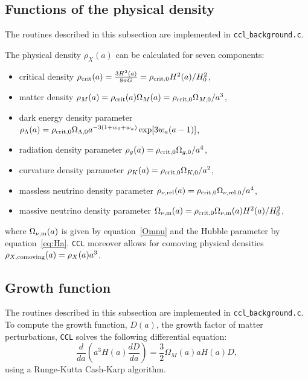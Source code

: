 \documentclass[\docopts]{\docclass}
\newcommand{\ccl}{{\tt CCL}\xspace}
\begin{document}
\subsection{Functions of the physical density}
\label{subsec:physicaldensity}

The routines described in this subsection are implemented in {\tt ccl$\_$background.c}.

The physical density $\rho_X(a)$ can be calculated for seven components:
\begin{itemize}
\item critical density $\rho_{\rm crit}(a) = {{3 H^2(a)} \over { 8 \pi G}} = \rho_{\rm crit,0} H^2(a) / H_0^2$,
\item matter density $\rho_M(a) = \rho_{\rm crit}(a) \Omega_M(a) = \rho_{\rm crit,0} \Omega_{M,0} / a^{3}$,
\item dark energy density parameter $\rho_\Lambda(a) = \rho_{\rm crit,0} \Omega_{\Lambda,0} a^{-3(1+w_0+w_a)} \exp[3 w_a (a-1)]$,
\item radiation density parameter $\rho_g(a) = \rho_{\rm crit,0} \Omega_{g,0} / a^{4}$,
\item curvature density parameter $\rho_K(a) = \rho_{\rm crit,0} \Omega_{K,0} / a^{2}$,
\item massless neutrino density parameter $\rho_{\nu, {\rm rel}}(a) = \rho_{\rm crit,0} \Omega_{\nu, {\rm rel},0} / a^{4}$,
\item massive neutrino density parameter $\Omega_{\nu, {\rm m}}(a) = \rho_{\rm crit,0} \Omega_{\nu, {\rm m}}(a) H^2(a) / H_0^2$,
\end{itemize}
where $\Omega_{\nu, {\rm m}}(a)$ is given by equation~\ref{Omnu} and the Hubble parameter by equation~\ref{eq:Ha}. \ccl moreover allows for comoving physical densities $\rho_{X, {\rm comoving}}(a) = \rho_X(a) a^3$.


\subsection{Growth function}
\label{sec:growth}

The routines described in this subsection are implemented in {\tt ccl$\_$background.c}.
To compute the growth function, $D(a)$, the growth factor of matter perturbations, \ccl solves the following differential equation:
\begin{equation}
  \frac{d}{da}\left(a^3H(a)\frac{dD}{da}\right)=\frac{3}{2}\Omega_M(a)aH(a)D,
\end{equation}
using a Runge-Kutta Cash-Karp algorithm.
\end{document}

